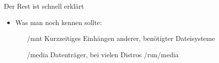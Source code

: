 \begin{frame}{Der Rest ist schnell erklärt}
\begin{itemize}
\item Was man noch kennen sollte: \\
\begin{itemize}
\item[/mnt] Kurzzeitiges Einhängen anderer, benötigter Dateisysteme
\item[/media] Datenträger, bei vielen Distros /run/media
\end{itemize}
\end{itemize}
\end{frame}